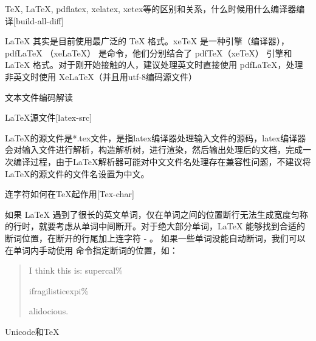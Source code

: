\begin{faq}{\TeX{}, \LaTeX{}, pdflatex, xelatex, xetex等的区别和关系，什么时候用什么编译器编译}[build-all-diff]

  LaTeX 其实是目前使用最广泛的 \TeX{} 格式。xeTeX 是一种引擎（编译器），pdfLaTeX （xeLaTeX） 是命令，他们分别结合了 pdfTeX（xeTeX） 引擎和 \LaTeX{} 格式。对于刚开始接触的人，建议处理英文时直接使用 pdfLaTeX，处理非英文时使用 XeLaTeX（并且用utf-8编码源文件） 

\end{faq}

\begin{faq}{文本文件编码解读}
\end{faq}

\begin{faq}{\LaTeX{}源文件}[latex-src]

  LaTeX的源文件是*.tex文件，是指latex编译器处理输入文件的源码，latex编译器会对输入文件进行解析，构造解析树，进行渲染，然后输出处理后的文档，完成一次编译过程，由于LaTeX解析器可能对中文文件名处理存在兼容性问题，不建议将LaTeX的源文件的文件名设置为中文。

\end{faq}

\begin{faq}{连字符如何在\TeX{}起作用}[Tex-char]

  如果 LaTeX 遇到了很长的英文单词，仅在单词之间的位置断行无法生成宽度匀称的行时，就要考虑从单词中间断开。对于绝大部分单词，LaTeX 能够找到合适的断词位置，在断开的行尾加上连字符 - 。
  如果一些单词没能自动断词，我们可以在单词内手动使用 \- 命令指定断词的位置，如：
  
  \begin{quote}
  I think this is: su\-per\-cal\-\%
  
  i\-frag\-i\-lis\-tic\-ex\-pi\-\%
  
  al\-i\-do\-cious.
  \end{quote}

\end{faq}

\begin{faq}{Unicode和\TeX{}}
\end{faq}

